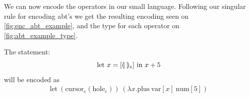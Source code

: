 \documentclass[sigplan,review]{acmart}
\newcommand{\abt}{\textsf{abt}\xspace}
\begin{document}
\begin{example}\label{ex:enc_abt_example}
    We can now encode the operators in our small language. Following
    our singular rule for encoding {\abt}'s we get the resulting encoding
    seen on \cref{fig:enc_abt_example}, and the type for each operator
    on \cref{fig:abt_example_type}. 
    
    
    
\end{example}
%
The statement:
\begin{equation*}
        \text{let $x=[\llparenthesis \ \rrparenthesis_e]$ in $x+5$}
    \end{equation*}
will be encoded as
    \begin{align*} 
        \text{let} \ (\text{cursor}_e(\text{hole}_e)) \ (\lambda x . \text{plus} \ \text{var}[x] \ \text{num}[5])
  \end{align*}
\end{document}
